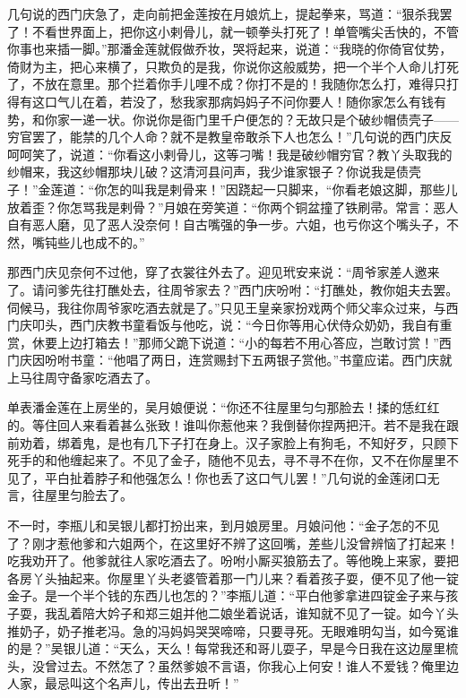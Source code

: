 几句说的西门庆急了，走向前把金莲按在月娘炕上，提起拳来，骂道：“狠杀我罢了！不看世界面上，把你这小剌骨儿，就一顿拳头打死了！单管嘴尖舌快的，不管你事也来插一脚。”那潘金莲就假做乔妆，哭将起来，说道：“我晓的你倚官仗势，倚财为主，把心来横了，只欺负的是我，你说你这般威势，把一个半个人命儿打死了，不放在意里。那个拦着你手儿哩不成？你打不是的！我随你怎么打，难得只打得有这口气儿在着，若没了，愁我家那病妈妈子不问你要人！随你家怎么有钱有势，和你家一递一状。你说你是衙门里千户便怎的？无故只是个破纱帽债壳子——穷官罢了，能禁的几个人命？就不是教皇帝敢杀下人也怎么！”几句说的西门庆反呵呵笑了，说道：“你看这小剌骨儿，这等刁嘴！我是破纱帽穷官？教丫头取我的纱帽来，我这纱帽那块儿破？这清河县问声，我少谁家银子？你说我是债壳子！”金莲道：“你怎的叫我是剌骨来！”因跷起一只脚来，“你看老娘这脚，那些儿放着歪？你怎骂我是剌骨？”月娘在旁笑道：“你两个铜盆撞了铁刷帚。常言：恶人自有恶人磨，见了恶人没奈何！自古嘴强的争一步。六姐，也亏你这个嘴头子，不然，嘴钝些儿也成不的。”

那西门庆见奈何不过他，穿了衣裳往外去了。迎见玳安来说：“周爷家差人邀来了。请问爹先往打醮处去，往周爷家去？”西门庆吩咐：“打醮处，教你姐夫去罢。伺候马，我往你周爷家吃酒去就是了。”只见王皇亲家扮戏两个师父率众过来，与西门庆叩头，西门庆教书童看饭与他吃，说：“今日你等用心伏侍众奶奶，我自有重赏，休要上边打箱去！”那师父跪下说道：“小的每若不用心答应，岂敢讨赏！”西门庆因吩咐书童：“他唱了两日，连赏赐封下五两银子赏他。”书童应诺。西门庆就上马往周守备家吃酒去了。

单表潘金莲在上房坐的，吴月娘便说：“你还不往屋里匀匀那脸去！揉的恁红红的。等住回人来看着甚么张致！谁叫你惹他来？我倒替你捏两把汗。若不是我在跟前劝着，绑着鬼，是也有几下子打在身上。汉子家脸上有狗毛，不知好歹，只顾下死手的和他缠起来了。不见了金子，随他不见去，寻不寻不在你，又不在你屋里不见了，平白扯着脖子和他强怎么！你也丢了这口气儿罢！”几句说的金莲闭口无言，往屋里匀脸去了。

不一时，李瓶儿和吴银儿都打扮出来，到月娘房里。月娘问他：“金子怎的不见了？刚才惹他爹和六姐两个，在这里好不辨了这回嘴，差些儿没曾辨恼了打起来！吃我劝开了。他爹就往人家吃酒去了。吩咐小厮买狼筋去了。等他晚上来家，要把各房丫头抽起来。你屋里丫头老婆管着那一门儿来？看着孩子耍，便不见了他一锭金子。是一个半个钱的东西儿也怎的？”李瓶儿道：“平白他爹拿进四锭金子来与孩子耍，我乱着陪大妗子和郑三姐并他二娘坐着说话，谁知就不见了一锭。如今丫头推奶子，奶子推老冯。急的冯妈妈哭哭啼啼，只要寻死。无眼难明勾当，如今冤谁的是？”吴银儿道：“天么，天么！每常我还和哥儿耍子，早是今日我在这边屋里梳头，没曾过去。不然怎了？虽然爹娘不言语，你我心上何安！谁人不爱钱？俺里边人家，最忌叫这个名声儿，传出去丑听！”

